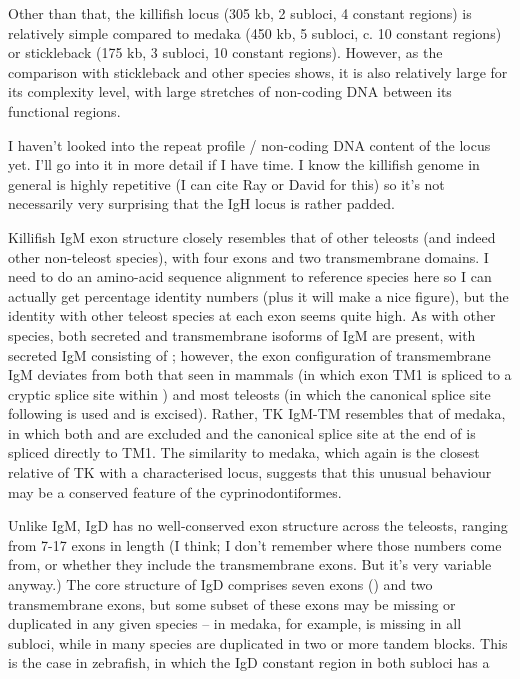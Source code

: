Other than that, the killifish locus (305 kb, 2 subloci, 4 constant regions) is relatively simple compared to medaka (450 kb, 5 subloci, c. 10 constant regions) or stickleback (175 kb, 3 subloci, 10 constant regions). However, as the comparison with stickleback and other species shows, it is also relatively large for its complexity level, with large stretches of non-coding DNA between its functional regions.


I haven't looked into the repeat profile / non-coding DNA content of the locus yet. I'll go into it in more detail if I have time. I know the killifish genome in general is highly repetitive (I can cite Ray or David for this) so it's not necessarily very surprising that the IgH locus is rather padded.


Killifish IgM exon structure closely resembles that of other teleosts (and indeed other non-teleost species), with four \cm{} exons and two transmembrane domains. I need to do an amino-acid sequence alignment to reference species here so I can actually get percentage identity numbers (plus it will make a nice figure), but the identity with other teleost species at each exon seems quite high. As with other species, both secreted and transmembrane isoforms of IgM are present, with secreted IgM consisting of ; however, the exon configuration of transmembrane IgM deviates from both that seen in mammals (in which exon TM1 is spliced to a cryptic splice site within ) and most teleosts (in which the canonical splice site following  is used and  is excised). Rather, TK IgM-TM resembles that of medaka, in which both  and  are excluded and the canonical splice site at the end of  is spliced directly to TM1. The similarity to medaka, which again is the closest relative of TK with a characterised locus, suggests that this unusual behaviour may be a conserved feature of the cyprinodontiformes.

Unlike IgM, IgD has no well-conserved exon structure across the teleosts, ranging from 7-17 exons in length (I think; I don't remember where those numbers come from, or whether they include the transmembrane exons. But it's very variable anyway.) The core structure of IgD comprises seven \cd{} exons () and two transmembrane exons, but some subset of these exons may be missing or duplicated in any given species -- in medaka, for example,  is missing in all subloci, while in many species  are duplicated in two or more tandem blocks. This is the case in zebrafish, in which the IgD constant region in both subloci has a 

